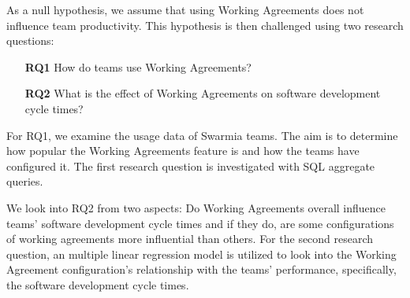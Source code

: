 As a null hypothesis, we assume that using Working Agreements does not influence team productivity. This hypothesis is then challenged using two research questions: 

\begin{enumerate}
    \item[{\bf RQ1}] How do teams use Working Agreements?
    \item[{\bf RQ2}] What is the effect of Working Agreements on software development cycle times?
\end{enumerate}

For RQ1, we examine the usage data of Swarmia teams. The aim is to determine how popular the Working Agreements feature is and how the teams have configured it. The first research question is investigated with SQL aggregate queries. 

We look into RQ2 from two aspects: Do Working Agreements overall influence teams' software development cycle times and if they do, are some configurations of working agreements more influential than others. For the second research question, an multiple linear regression model is utilized to look into the Working Agreement configuration's relationship with the teams' performance, specifically, the software development cycle times.